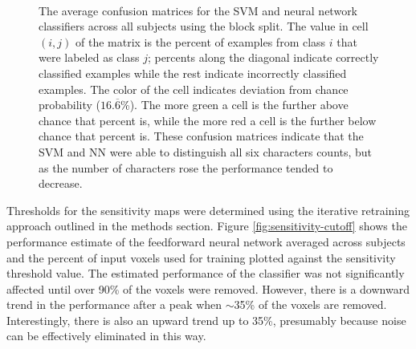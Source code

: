 \documentclass[5p,authoryear]{elsarticle}
\begin{document}
\begin{figure}
\centering
\begin{subfigure}{0.3\textwidth}
\centering
\begin{adjustbox}{center}

\end{adjustbox}
\caption{}
\label{fig:average-confusion-svm}
\end{subfigure}
\\
\begin{subfigure}{0.3\textwidth}
\centering
\begin{adjustbox}{center}

\end{adjustbox}
\caption{}
\label{fig:average-confusion-nn}
\end{subfigure}
\caption{The average confusion matrices for the  SVM and  neural network classifiers across all subjects using the block split.
The value in cell $(i,j)$ of the matrix is the percent of examples from class $i$ that were labeled as class $j$; percents along the diagonal indicate correctly classified examples while the rest indicate incorrectly classified examples.
The color of the cell indicates deviation from chance probability ($16.\overline{6}$\%).
The more green a cell is the further above chance that percent is, while the more red a cell is the further below chance that percent is.
These confusion matrices indicate that the SVM and NN were able to distinguish all six characters counts, but as the number of characters rose the performance tended to decrease.}
\label{fig:average-confusion}
\end{figure}

Thresholds for the sensitivity maps were determined using the iterative retraining approach outlined in the methods section.
Figure \ref{fig:sensitivity-cutoff} shows the performance estimate of the feedforward neural network averaged across subjects and the percent of input voxels used for training plotted against the sensitivity threshold value.
The estimated performance of the classifier was not significantly affected until over 90\% of the voxels were removed.
However, there is a downward trend in the performance after a peak when $\sim$35\% of the voxels are removed.
Interestingly, there is also an upward trend up to 35\%, presumably because noise can be effectively eliminated in this way.
\end{document}
